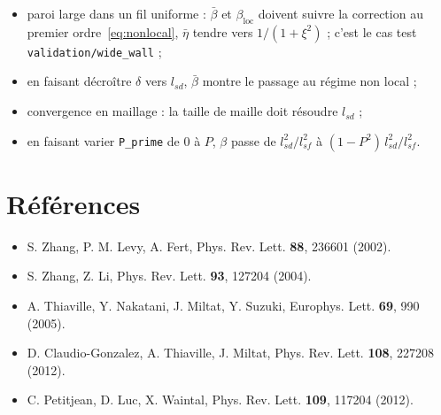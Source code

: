 \documentclass[11pt,a4paper]{article}
\newcommand{\code}[1]{\texttt{#1}}
\begin{document}
\begin{itemize}
  \item paroi large dans un fil uniforme : $\bar\beta$ et $\beta_{\text{loc}}$ doivent suivre la
    correction au premier ordre~\eqref{eq:nonlocal}, $\bar\eta$ tendre vers $1/(1+\xi^2)$ ;
    c'est le cas test \code{validation/wide\_wall} ;
  \item en faisant décroître $\delta$ vers $l_{sd}$, $\bar\beta$ montre le passage au régime non
    local ;
  \item convergence en maillage : la taille de maille doit résoudre $l_{sd}$ ;
  \item en faisant varier \code{P\_prime} de 0 à $P$, $\beta$ passe de $l_{sd}^2/l_{sf}^2$ à
    $(1-P^2)\,l_{sd}^2/l_{sf}^2$.
\end{itemize}

\section*{Références}

\begin{itemize}
  \item S. Zhang, P. M. Levy, A. Fert, Phys. Rev. Lett. \textbf{88}, 236601 (2002).
  \item S. Zhang, Z. Li, Phys. Rev. Lett. \textbf{93}, 127204 (2004).
  \item A. Thiaville, Y. Nakatani, J. Miltat, Y. Suzuki, Europhys. Lett. \textbf{69}, 990 (2005).
  \item D. Claudio-Gonzalez, A. Thiaville, J. Miltat, Phys. Rev. Lett. \textbf{108}, 227208 (2012).
  \item C. Petitjean, D. Luc, X. Waintal, Phys. Rev. Lett. \textbf{109}, 117204 (2012).
\end{itemize}
\end{document}

